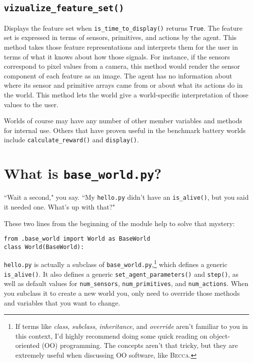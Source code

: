 \subsection{\texttt{vizualize\_feature\_set()}}
Displays the feature set when \texttt{is\_time\_to\_display()} returns \texttt{True}. The feature set is expressed in terms of sensors, primitives, and actions by the agent. This method takes those feature representations and interprets them for the user in terms of what it knows about how those signals. For instance, if the sensors correspond to pixel values from a camera, this method would render the sensor component of each feature as an image. The agent has no information about where its sensor and primitive arrays came from or about what its actions do in the world. This method lets the world give a world-specific interpretation of those values to the user.

Worlds of course may have any number of other member variables and methods for internal use. Others that have proven useful in the benchmark battery worlds include \texttt{calculate\_reward()} and \texttt{display()}.

\section{What is \texttt{base\_world.py}?}
``Wait a second," you say. ``My \texttt{hello.py} didn't have an \texttt{is\_alive()}, but you said it needed one. What's up with that?"

These two lines from the beginning of the module help to solve that mystery:
\begin{verbatim}
from .base_world import World as BaseWorld
class World(BaseWorld):
\end{verbatim}

\texttt{hello.py} is actually a subclass of \texttt{base\_world.py},\footnote{If terms like {\em class}, {\em subclass}, {\em inheritance}, and {\em override} aren't familiar to you in this context, I'd highly recommend doing some quick reading on object-oriented (OO) programming. The concepts aren't that tricky, but they are extremely useful when discussing OO software, like \textsc{Becca}.} which defines a generic \texttt{is\_alive()}. It also defines a generic \texttt{set\_agent\_parameters()} and \texttt{step()}, as well as default values for  \texttt{num\_sensors}, \texttt{num\_primitives}, and \texttt{num\_actions}. When you subclass it to create a new world you, only need to override those methods and variables that you want to change.



